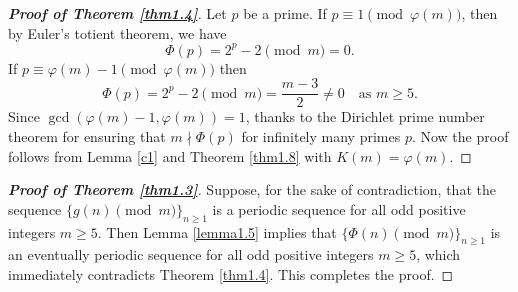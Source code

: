 \documentclass[12pt,reqno]{amsart}
\begin{document}
\begin{proof}[\textbf{Proof of Theorem \ref{thm1.4}}]
Let $p$ be a prime. If $p\equiv 1\pmod{\varphi(m)}$, then by Euler's totient theorem, we have
$$\Phi(p)=2^{p}-2\pmod{m}=0.$$
If $p\equiv\varphi(m)-1\pmod{\varphi(m)}$ then
$$\Phi(p)=2^{p}-2\pmod{m}=\frac{m-3}{2}\neq 0\quad \text{as~}m\geq5.$$
Since $\gcd(\varphi(m)-1,\varphi(m))=1$, thanks to the Dirichlet prime number theorem for ensuring that $m\nmid \Phi(p)$ for infinitely many primes $p$. Now the proof follows from Lemma \ref{c1} and Theorem \ref{thm1.8} with $K(m)=\varphi(m)$.
\end{proof}





\begin{proof}[\textbf{Proof of Theorem \ref{thm1.3}}]
Suppose, for the sake of contradiction, that the sequence $\{g(n) \pmod{m}\}_{n\geq1}$ is a periodic sequence for all odd positive integers $m\geq 5$. Then Lemma \ref{lemma1.5} implies that $\{\Phi(n) \pmod{m}\}_{n\geq 1}$ is an eventually periodic sequence for all odd positive integers $m\geq 5$, which immediately contradicts Theorem \ref{thm1.4}. This completes the proof.
\end{proof}
\end{document}
